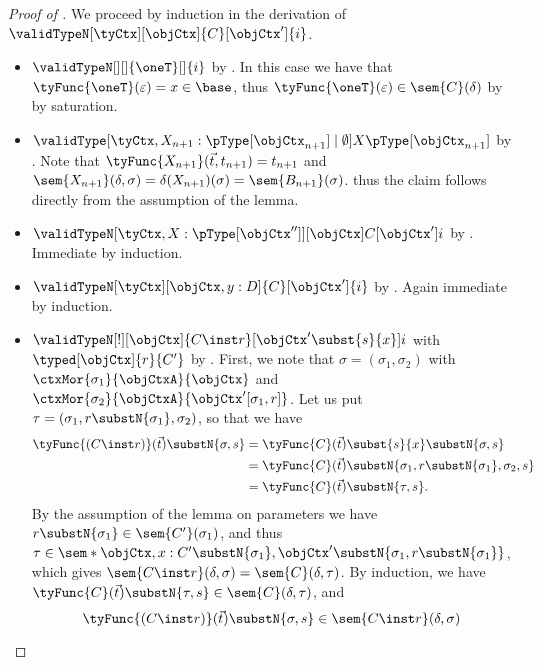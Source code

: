 \documentclass[preprint]{sigplanconf}
\begin{document}
\begin{proof}[Proof of ]
  We proceed by induction in the derivation of
  $\validTypeN[\tyCtx][\objCtx]{C}[\objCtx']{i}$.
  \begin{itemize}
  \item $\validTypeN[][]{\oneT}[]{i}$ by \TTyI.
    In this case we have that $\tyFunc{\oneT}(\varepsilon) = x \in \base$,
    thus $\tyFunc{\oneT}(\varepsilon) \in \sem{C}(\delta)$ by
    by saturation.
  \item $\validType[\tyCtx, X_{n+1} : {\pType[\objCtx_{n+1}]} \mid \emptyset]{X}{
      \pType[\objCtx_{n+1}]}$ by \TyVarI.
    Note that
    $\tyFunc{X_{n+1}}(\vec{t}, t_{n+1}) = t_{n+1}$ and
    $\sem{X_{n+1}}(\delta, \sigma) = \delta(X_{n+1})(\sigma)
    = \sem{B_{n+1}}(\sigma)$.
    thus the claim follows directly from the assumption of the lemma.
  \item $\validTypeN[\tyCtx, X : {\pType[\objCtx'']}][\objCtx]{C}[\objCtx']{i}$
    by \TyVarWeak.
    Immediate by induction.
  \item $\validTypeN[\tyCtx][\objCtx, y : D]{C}[\objCtx']{i}$ by \TyWeak.
    Again immediate by induction.
  \item $\validTypeN[!][\objCtx]{C \inst r}[\objCtx' \subst{s}{x}]{i}$ with
    $\typed[\objCtx]{r}{C'}$ by \TyInst.
    First, we note that $\sigma = (\sigma_1, \sigma_2)$ with
    $\ctxMor{\sigma_1}{\objCtxA}{\objCtx}$ and
    $\ctxMor{\sigma_2}{\objCtxA}{\objCtx'[\sigma_1,r]}$.
    Let us put $\tau = (\sigma_1, r \substN{\sigma_1}, \sigma_2)$,
    so that we have
    \begin{align*}
      \tyFunc{(C \inst r)}(\vec{t}) \substN{\sigma, s}
      & = \tyFunc{C}(\vec{t}) \subst{s}{x} \substN{\sigma, s} \\
      & = \tyFunc{C}(\vec{t})
      \substN{\sigma_1, r \substN{\sigma_1}, \sigma_2, s} \\
      & = \tyFunc{C}(\vec{t}) \substN{\tau, s}.
    \end{align*}
    By the assumption of the lemma on parameters we have
    $r \substN{\sigma_1} \in \sem{C'}(\sigma_1)$, and thus
    $\tau \in
    \sem*{\objCtx, x : C' \substN{\sigma_1},
      \objCtx' \substN{\sigma_1, r \substN{\sigma_1}}}$,
    which gives
    $\sem{C \inst r}(\delta, \sigma) = \sem{C}(\delta, \tau)$.
    By induction, we have
    $\tyFunc{C}(\vec{t}) \substN{\tau, s} \in \sem{C}(\delta, \tau)$,
    and
    \begin{equation*}
      \tyFunc{(C \inst r)}(\vec{t}) \substN{\sigma, s}
      \in \sem{C \inst r}(\delta, \sigma)

\end{equation*}
\end{itemize}
\end{proof}
\end{document}
